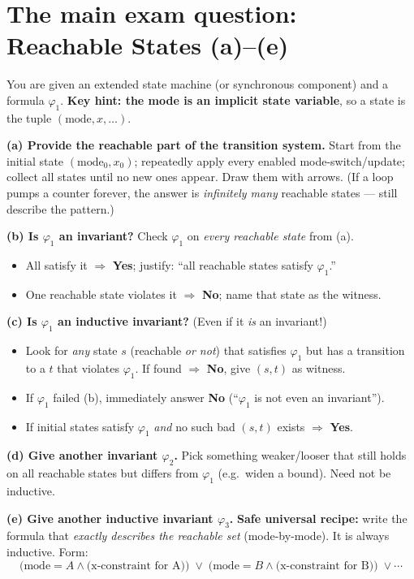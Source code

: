 \section{The main exam question: Reachable States (a)--(e)}
You are given an extended state machine (or synchronous component) and a formula $\varphi_1$. \textbf{Key hint: the mode is an implicit state variable}, so a state is the tuple $(\text{mode},x,\dots)$.

\textbf{(a) Provide the reachable part of the transition system.} Start from the initial state $(\text{mode}_0,x_0)$; repeatedly apply every enabled mode-switch/update; collect all states until no new ones appear. Draw them with arrows. (If a loop pumps a counter forever, the answer is \emph{infinitely many} reachable states --- still describe the pattern.)

\textbf{(b) Is $\varphi_1$ an invariant?} Check $\varphi_1$ on \emph{every reachable state} from (a).
\begin{itemize}
  \item All satisfy it $\Rightarrow$ \textbf{Yes}; justify: ``all reachable states satisfy $\varphi_1$.''
  \item One reachable state violates it $\Rightarrow$ \textbf{No}; name that state as the witness.
\end{itemize}

\textbf{(c) Is $\varphi_1$ an inductive invariant?} (Even if it \emph{is} an invariant!)
\begin{itemize}
  \item Look for \emph{any} state $s$ (reachable \emph{or not}) that satisfies $\varphi_1$ but has a transition to a $t$ that violates $\varphi_1$. If found $\Rightarrow$ \textbf{No}, give $(s,t)$ as witness.
  \item If $\varphi_1$ failed (b), immediately answer \textbf{No} (``$\varphi_1$ is not even an invariant'').
  \item If initial states satisfy $\varphi_1$ \emph{and} no such bad $(s,t)$ exists $\Rightarrow$ \textbf{Yes}.
\end{itemize}

\textbf{(d) Give another invariant $\varphi_2$.} Pick something weaker/looser that still holds on all reachable states but differs from $\varphi_1$ (e.g.\ widen a bound). Need not be inductive.

\textbf{(e) Give another inductive invariant $\varphi_3$.} \textbf{Safe universal recipe:} write the formula that \emph{exactly describes the reachable set} (mode-by-mode). It is always inductive. Form:
\[
\bigl(\text{mode}=A \wedge \text{(x-constraint for A)}\bigr)\;\vee\;\bigl(\text{mode}=B \wedge \text{(x-constraint for B)}\bigr)\;\vee\cdots
\]

